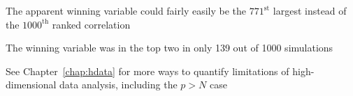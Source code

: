 \item The apparent winning variable could fairly easily be the $771^\textrm{st}$ largest instead of the $1000^\textrm{th}$ ranked correlation
\item The winning variable was in the top two in only 139 out of 1000 simulations
\item See Chapter~\ref{chap:hdata} for more ways to quantify limitations of high-dimensional data analysis, including the $p > N$ case
\ei
